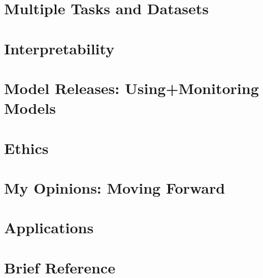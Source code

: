 \documentclass[12pt]{book}
\begin{document}








\part{Multiple Tasks and Datasets}












\part{Interpretability}




\part{Model Releases: Using+Monitoring Models}



\part{Ethics}



\part{My Opinions: Moving Forward}




\part{Applications}





\part{Brief Reference}


\end{document}
